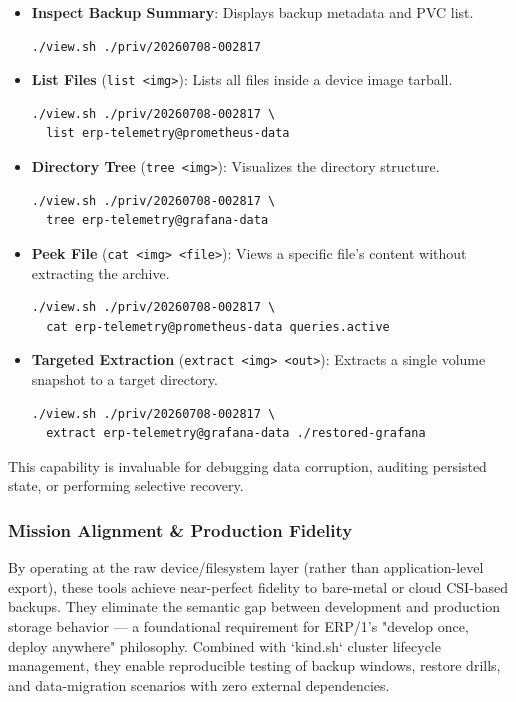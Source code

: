 \documentclass{article}
\begin{document}
\begin{itemize}
\item \textbf{Inspect Backup Summary}: Displays backup metadata and PVC list.
\begin{verbatim}
./view.sh ./priv/20260708-002817
\end{verbatim}

\item \textbf{List Files} (\texttt{list <img>}): Lists all files inside a device image tarball.
\begin{verbatim}
./view.sh ./priv/20260708-002817 \
  list erp-telemetry@prometheus-data
\end{verbatim}

\item \textbf{Directory Tree} (\texttt{tree <img>}): Visualizes the directory structure.
\begin{verbatim}
./view.sh ./priv/20260708-002817 \
  tree erp-telemetry@grafana-data
\end{verbatim}

\item \textbf{Peek File} (\texttt{cat <img> <file>}): Views a specific file's content without extracting the archive.
\begin{verbatim}
./view.sh ./priv/20260708-002817 \
  cat erp-telemetry@prometheus-data queries.active
\end{verbatim}

\item \textbf{Targeted Extraction} (\texttt{extract <img> <out>}): Extracts a single volume snapshot to a target directory.
\begin{verbatim}
./view.sh ./priv/20260708-002817 \
  extract erp-telemetry@grafana-data ./restored-grafana
\end{verbatim}
\end{itemize}

This capability is invaluable for debugging data corruption, auditing persisted state, or performing selective recovery.

\subsubsection{Mission Alignment \& Production Fidelity}

By operating at the raw device/filesystem layer (rather than application-level export),
these tools achieve near-perfect fidelity to bare-metal or cloud CSI-based backups.
They eliminate the semantic gap between development and production storage behavior —
a foundational requirement for ERP/1's "develop once, deploy anywhere" philosophy.
Combined with `kind.sh` cluster lifecycle management, they enable reproducible testing
of backup windows, restore drills, and data-migration scenarios with zero external dependencies.
\end{document}
